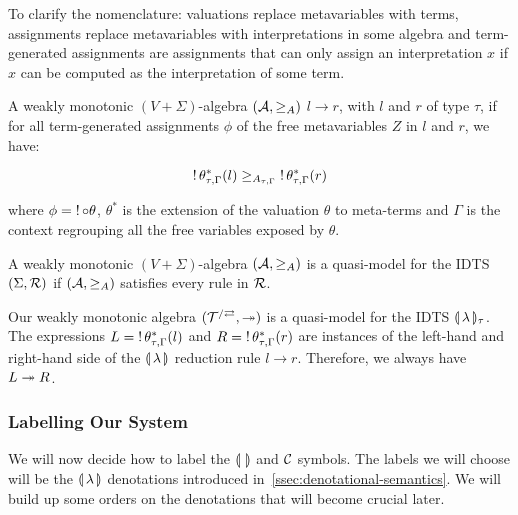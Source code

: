 To clarify the nomenclature: valuations replace metavariables with terms,
assignments replace metavariables with interpretations in some algebra and
term-generated assignments are assignments that can only assign an
interpretation $x$ if $x$ can be computed as the interpretation of some
term.

\begin{definition}
  A weakly monotonic $(V+\Sigma)$-algebra $(\mathcal{A}, \ge_A)$  $l \to r$, with $l$ and $r$ of type $\tau$, if
  for all term-generated assignments $\phi$ of the free metavariables $Z$
  in $l$ and $r$, we have:

  $$
  \mathop{!} \theta^*_{\tau,\Gamma}(l) \ge_{A_{\tau,\Gamma}} \mathop{!} \theta^*_{\tau,\Gamma}(r)
  $$

  where $\phi = \mathop{!} {\mathbin{\circ}} \theta$, $\theta^*$ is the extension of the
  valuation $\theta$ to meta-terms and $\Gamma$ is the context regrouping
  all the free variables exposed by $\theta$.
\end{definition}

\begin{definition}
  A weakly monotonic $(V+\Sigma)$-algebra $(\mathcal{A}, \ge_A)$ is a quasi-model
  for the IDTS $(\Sigma, \mathcal{R})$ if $(\mathcal{A}, \ge_A)$ satisfies every rule in
  $\mathcal{R}$.
\end{definition}

Our weakly monotonic algebra $(\mathcal{T}^{/\rightleftarrows}, \twoheadrightarrow)$ is a
quasi-model for the IDTS ${\llparenthesis \, \lambda \, \rrparenthesis_\tau}$. The expressions
$L = \mathop{!} \theta^*_{\tau,\Gamma}(l)$ and
$R = \mathop{!} \theta^*_{\tau,\Gamma}(r)$ are instances of the left-hand and
right-hand side of the ${\llparenthesis \, \lambda \, \rrparenthesis}$ reduction rule $l \to r$. Therefore, we
always have $L \twoheadrightarrow R$.


\subsubsection{Labelling Our System}

We will now decide how to label the $\llparenthesis \,  \, \rrparenthesis$ and $\mathcal{C}$ symbols. The
labels we will choose will be the $\llparenthesis \, \lambda \, \rrparenthesis$ denotations introduced
in~\ref{ssec:denotational-semantics}. We will build up some orders on the
denotations that will become crucial later.

